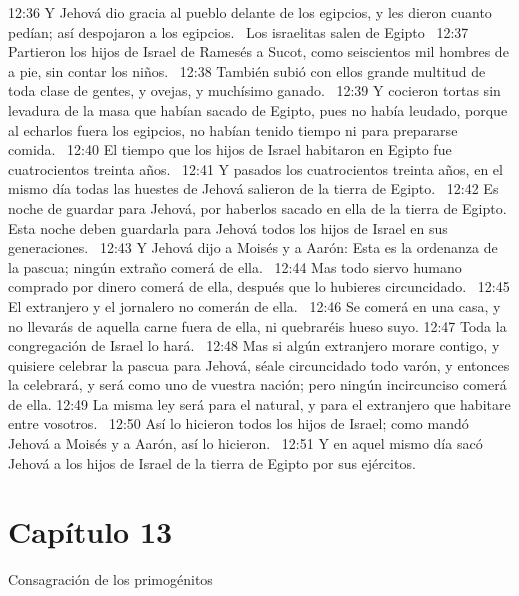 12:36 Y Jehová dio gracia al pueblo delante de los egipcios, y les dieron cuanto pedían; así despojaron a los egipcios.  
Los israelitas salen de Egipto  
12:37 Partieron los hijos de Israel de Ramesés a Sucot, como seiscientos mil hombres de a pie, sin contar los niños.  
12:38 También subió con ellos grande multitud de toda clase de gentes, y ovejas, y muchísimo ganado.  
12:39 Y cocieron tortas sin levadura de la masa que habían sacado de Egipto, pues no había leudado, porque al echarlos fuera los egipcios, no habían tenido tiempo ni para prepararse comida.  
12:40 El tiempo que los hijos de Israel habitaron en Egipto fue cuatrocientos treinta años.  
12:41 Y pasados los cuatrocientos treinta años, en el mismo día todas las huestes de Jehová salieron de la tierra de Egipto.  
12:42 Es noche de guardar para Jehová, por haberlos sacado en ella de la tierra de Egipto. Esta noche deben guardarla para Jehová todos los hijos de Israel en sus generaciones.  
12:43 Y Jehová dijo a Moisés y a Aarón: Esta es la ordenanza de la pascua; ningún extraño comerá de ella.  
12:44 Mas todo siervo humano comprado por dinero comerá de ella, después que lo hubieres circuncidado.  
12:45 El extranjero y el jornalero no comerán de ella.  
12:46 Se comerá en una casa, y no llevarás de aquella carne fuera de ella, ni quebraréis hueso suyo. 
12:47 Toda la congregación de Israel lo hará.  
12:48 Mas si algún extranjero morare contigo, y quisiere celebrar la pascua para Jehová, séale circuncidado todo varón, y entonces la celebrará, y será como uno de vuestra nación; pero ningún incircunciso comerá de ella. 
12:49 La misma ley será para el natural, y para el extranjero que habitare entre vosotros.  
12:50 Así lo hicieron todos los hijos de Israel; como mandó Jehová a Moisés y a Aarón, así lo hicieron.  
12:51 Y en aquel mismo día sacó Jehová a los hijos de Israel de la tierra de Egipto por sus ejércitos.  
\section*{Capítulo 13}
Consagración de los primogénitos  

